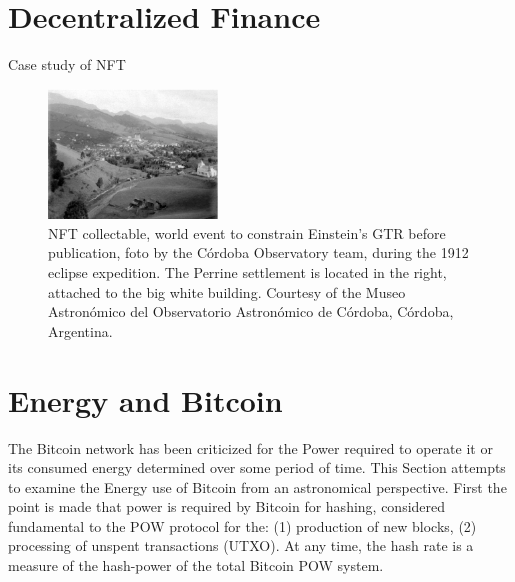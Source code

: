 \documentclass[final,5p,times,twocolumn,authoryear]{elsarticle}
\begin{document}
\section{Decentralized Finance} 

Case study of NFT
\begin{figure}[h!]
    \centering
    \label{fig:my_label}
  \caption{NFT collectable, world event to constrain Einstein's GTR before publication, foto by the C\'ordoba Observatory team,
during the 1912 eclipse expedition. The Perrine settlement is located in the right, attached to the big white building. Courtesy of the Museo Astron\'omico del Observatorio Astron\'omico de C\'ordoba, C\'ordoba, Argentina.}
  \includegraphics[width=0.4\textwidth]{figs/p1912.eps}
\end{figure}


\section{Energy and Bitcoin}
The Bitcoin network has been criticized for the Power required to operate it or its consumed energy determined over some period of time. This Section attempts to examine the Energy use of Bitcoin from an astronomical perspective. First the point is made that power is required by Bitcoin for hashing, considered fundamental to the POW protocol for the: (1) production of new blocks, (2) processing of unspent transactions (UTXO). At any time, the hash rate is a measure of the hash-power of the total Bitcoin POW system. 
\end{document}
